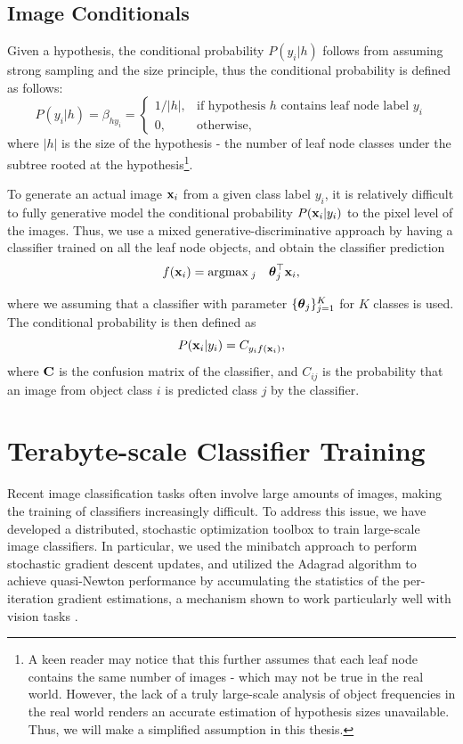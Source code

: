 \subsection{Image Conditionals}
Given a hypothesis, the conditional probability $P(y_i | h)$ follows from assuming strong sampling \cite{tenenbaum2001generalization} and the size principle, thus the conditional probability is defined as follows:
\begin{equation}
    P(y_i | h) = \beta_{hy_i} = \left\{\begin{array}{ll}
            1/|h|, & \text{if hypothesis } h \text{ contains leaf node label } y_i\\
                0, & \text{otherwise},
        \end{array}\right.
\end{equation}
where $|h|$ is the size of the hypothesis - the number of leaf node classes under the subtree rooted at the hypothesis\footnote{A keen reader may notice that this further assumes that each leaf node contains the same number of images - which may not be true in the real world. However, the lack of a truly large-scale analysis of object frequencies in the real world renders an accurate estimation of hypothesis sizes unavailable. Thus, we will make a simplified assumption in this thesis.}.

To generate an actual image $\mathbf{x}_i$ from a given class label $y_i$, it is relatively difficult to fully generative model the conditional probability $P(\mathbf{x}_i | y_i)$ to the pixel level of the images. Thus, we use a mixed generative-discriminative approach by having a classifier trained on all the leaf node objects, and obtain the classifier prediction
\begin{equation}
    f(\mathbf{x}_i) = \underset{}{\mathrm{argmax}} \:_{j}\quad \boldsymbol{\theta}_j^\top \mathbf{x}_i,
\end{equation}
where we assuming that a classifier with parameter $\{\boldsymbol{\theta}_j\}_{j=1}^{K}$ for $K$ classes is used. The conditional probability is then defined as
\begin{equation}
    P(\mathbf{x}_i|y_i) = C_{y_if(\mathbf{x}_i)},
\end{equation}
where $\mathbf{C}$ is the confusion matrix of the classifier, and $C_{ij}$ is the probability that an image from object class $i$ is predicted class $j$ by the classifier.

\section{Terabyte-scale Classifier Training}
Recent image classification tasks often involve large amounts of images, making the training of classifiers increasingly difficult. To address this issue, we have developed a distributed, stochastic optimization toolbox to train large-scale image classifiers. In particular, we used the minibatch approach to perform stochastic gradient descent updates, and utilized the Adagrad \cite{duchi2010adaptive} algorithm to achieve quasi-Newton performance by accumulating the statistics of the per-iteration gradient estimations, a mechanism shown to work particularly well with vision tasks \cite{dean2012large}.

